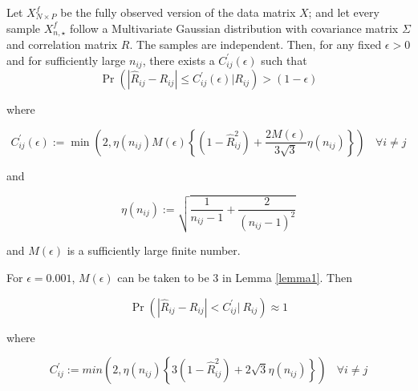 \begin{lemma}\label{lemma1}
Let $X^f_{N \times P}$ be the fully observed version of the data matrix $X$; and let 
every sample $X^f_{n,\star}$ follow a Multivariate Gaussian distribution with covariance matrix $\Sigma$ and correlation matrix $R$. The samples are independent. Then, for any fixed $\epsilon > 0$ and for sufficiently large $n_{ij}$, there exists a $C^{'}_{ij} (\epsilon)$ such that 
\begin{equation}
    \Pr \left (|\hat{R}_{ij} - R_{ij} | \leq C^{'}_{ij} (\epsilon) \bigg |  R_{ij} \right ) > (1 - \epsilon)
\end{equation}

where

\begin{equation}\label{eq:defineCstar}
    C^{'}_{ij} (\epsilon) := \min \left (2,  \eta (n_{ij}) M(\epsilon) \left \{  (1 - \hat{R}^2_{ij}) + \frac{2 M (\epsilon)}{3 \sqrt{3}} \eta (n_{ij}) \right \} \right ) ~~~~\forall i \neq j
\end{equation}

and

\begin{equation}\label{eq:eta}
    \eta(n_{ij}) := \sqrt{\frac{1}{n_{ij} - 1} + \frac{2}{(n_{ij} - 1)^2}}
\end{equation}

and $M(\epsilon)$ is a sufficiently large finite number.

\end{lemma}

\begin{corollary}\label{corollary1}

For $\epsilon = 0.001$, $M(\epsilon)$ can be taken to be $3$ in Lemma \ref{lemma1}. Then

\begin{equation}\label{eq:boundcorollary1}
    \Pr \left (|\hat{R}_{ij} - R_{ij} | <  C^{'}_{ij} \bigg |~R_{ij}  \right )  \approx 1 
\end{equation}

where 

\begin{equation}\label{eq:definecstar}
    C^{'}_{ij}  := min \left (2,  \eta (n_{ij}) \left \{ 3 (1 - \hat{R}^2_{ij}) + 2 \sqrt{3} \eta (n_{ij}) \right \} \right ) ~~~~ \forall i \neq j
\end{equation}

\end{corollary}

